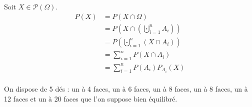 \begin{prv}
	Soit $X \in \mathcal{P}(\Omega)$.
	\begin{align*}
		P(X) &= P(X \cap \Omega) \\
		&= P\left( X \cap \left( \bigcupdot_{i=1}^n A_i \right) \right) \\
		&= P\left( \bigcupdot_{i=1}^n (X \cap A_i) \right) \\
		&= \sum_{i=1}^n P(X \cap A_i) \\
		&= \sum_{i=1}^n P(A_i) P_{A_i}(X) \\
	\end{align*}
\end{prv}

\begin{exm}
	On dispose de 5 dés : un à 4 faces, un à 6 faces, un à 8 faces, un à 8 faces, un à 12 faces et un à 20 faces que l'on suppose bien équilibré.


\end{exm}
